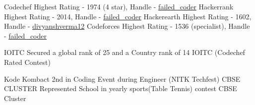 \documentclass[11pt, a4paper]{awesome-cv}
\begin{document}
    \begin{cvhonors}
    \cvhonor
    {Codechef} %
    {Highest Rating - 1974 (4 star), Handle - \href{<https://www.codechef.com/users/failed_coder>}{failed\_coder} } %
    {} %
    {} %
    \cvhonor
    {Hackerrank} %
    {Highest Rating - 2014, Handle - \href{<https://www.hackerrank.com/failed_coder>}{failed\_coder} } %
    {} %
    {} %
    \cvhonor
    {Hackerearth} %
    {Highest Rating - 1602, Handle - \href{<https://www.hackerearth.com/@divyanshverma12>}{divyanshverma12} } %
    {} %
    {} %
    \cvhonor
    {Codeforces} %
    {Highest Rating - 1536 (specialist), Handle - \href{<http://codeforces.com/profile/failed_coder>}{failed\_coder} } %
    {} %
    {} %
\end{cvhonors}

\begin{cvhonors}

  \cvhonor
    {IOITC} %
    {Secured a global rank of 25 and a Country rank of 14 IOITC (Codechef Rated Contest)} %
    {} %
    {} %

  \cvhonor
    {Kode Kombact} %
    {2nd in Coding Event during Engineer (NITK Techfest)} %
    {} %
    {} %
    \cvhonor
    {CBSE CLUSTER} %
    {Represented School in yearly sports(Table Tennis) contest CBSE Cluster} %
    {} %
    {} %
   \end{cvhonors}
\end{document}
